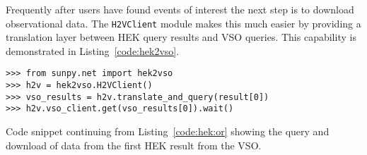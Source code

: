 Frequently after users have found events of interest the next step is to 
download observational data. The \texttt{H2VClient} module makes this
much easier by providing a translation layer between HEK query results
and VSO queries. This capability is demonstrated in Listing~\ref{code:hek2vso}.
\begin{listing}[H]
\begin{verbatim}
>>> from sunpy.net import hek2vso
>>> h2v = hek2vso.H2VClient()
>>> vso_results = h2v.translate_and_query(result[0])
>>> h2v.vso_client.get(vso_results[0]).wait()
\end{verbatim}
\caption{Code snippet continuing from Listing~\ref{code:hek:or} showing the 
query and download of data from the first HEK result from the VSO.}
\label{code:hek2vso}
\end{listing}